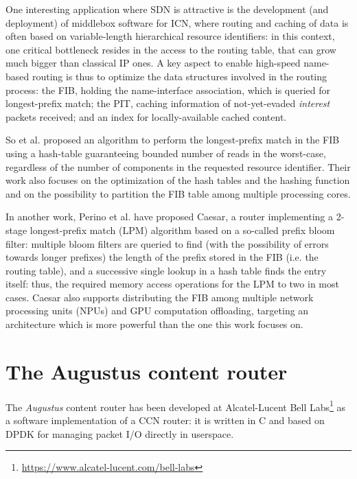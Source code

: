 \documentclass[11pt,a4paper,twoside,titlepage,openany]{book}
\begin{document}
One interesting application where SDN is attractive is the development (and deployment) of middlebox software for \gls{ICN}, where routing and caching of data is often based on variable-length hierarchical resource identifiers: in this context, one critical bottleneck resides in the access to the routing table, that can grow much bigger than classical IP ones.
A key aspect to enable high-speed name-based routing is thus to optimize the data structures involved in the routing process: the \gls{FIB}, holding the name-interface association, which is queried for longest-prefix match; the \gls{PIT}, caching information of not-yet-evaded \emph{interest} packets received; and an index for locally-available cached content.

So et al. \cite{ndn_fast_dosresistant} proposed an algorithm to perform the longest-prefix match in the \gls{FIB} using a hash-table guaranteeing bounded number of reads in the worst-case, regardless of the number of components in the requested resource identifier. Their work also focuses on the optimization of the hash tables and the hashing function and on the possibility to partition the \gls{FIB} table among multiple processing cores.

In another work, Perino et al. \cite{caesar} have proposed Caesar, a router implementing a 2-stage longest-prefix match (LPM) algorithm based on a so-called prefix bloom filter: multiple bloom filters are queried to find (with the possibility of errors towards longer prefixes) the length of the prefix stored in the \gls{FIB} (i.e. the routing table), and a successive single lookup in a hash table finds the entry itself: thus, the required memory access operations for the LPM to two in most cases. Caesar also supports distributing the \gls{FIB} among multiple network processing units (NPUs) and GPU computation offloading, targeting an architecture which is more powerful than the one this work focuses on.



\chapter{The Augustus content router}
\label{chap:augustus}

The \emph{Augustus} content router has been developed at Alcatel-Lucent Bell Labs\footnote{\url{https://www.alcatel-lucent.com/bell-labs}} as a software implementation of a \gls{CCN} router:
it is written in C and based on DPDK \cite{dpdk} for managing packet I/O directly in userspace.
\end{document}

